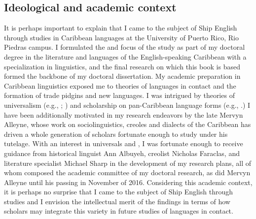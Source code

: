 \subsection{ {Ideological}  {and}  {academic}  {context}}

It is perhaps important to explain that I came to the subject of Ship English through studies in Caribbean languages at the University of Puerto Rico, Rio Piedras campus. I formulated the  and focus of the study as part of my doctoral degree in the literature and languages of the English-speaking Caribbean with a specialization in linguistics, and the final research on which this book is based formed the backbone of my doctoral dissertation. My academic preparation in Caribbean linguistics exposed me to theories of languages in contact and the formation of trade pidgins and new  languages. I was intrigued by theories of universalism (e.g., \citealt{MuyskenSmith1986}; \citealt{McWhorter2011}) and scholarship on pan-Caribbean language forms (e.g., \citealt{Allsopp2003,FaraclasEtAl2012}.) I have been additionally motivated in my research endeavors by the late Mervyn Alleyne, whose work on sociolinguistics, creoles and dialects of the Caribbean has driven a whole generation of scholars fortunate enough to study under his tutelage. With an interest in  universals and , I was fortunate enough to receive guidance from historical linguist Ann Albuyeh, creolist Nicholas Faraclas, and literature specialist Michael Sharp in the development of my research plans, all of whom composed the academic committee of my doctoral research, as did Mervyn Alleyne until his passing in November of 2016. Considering this academic context, it is perhaps no surprise that I came to the subject of Ship English through  studies and I envision the intellectual merit of the findings in terms of how scholars may integrate this variety in future studies of languages in contact.



